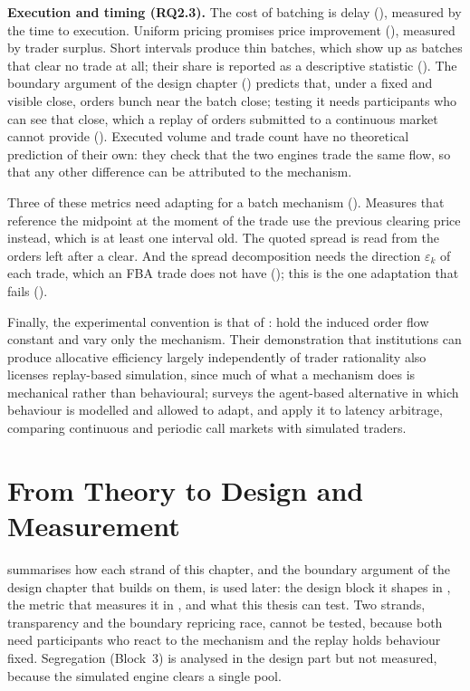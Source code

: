 \textbf{Execution and timing (RQ2.3).} The cost of batching is delay
(), measured by the time to execution. Uniform
pricing promises price improvement (), measured by
trader surplus. Short intervals produce thin batches, which show up as
batches that clear no trade at all; their share is reported as a
descriptive statistic (). The boundary argument of the design
chapter () predicts that, under a fixed and
visible close, orders bunch near the batch close; testing it needs
participants who can see that close, which a replay of orders submitted
to a continuous market cannot provide ().
Executed volume and trade count
have no theoretical prediction of their own: they check that the two
engines trade the same flow, so that any other difference can be
attributed to the mechanism.

Three of these metrics need adapting for a batch mechanism
(). Measures that reference the midpoint at the
moment of the trade use the previous clearing price instead, which is at
least one interval old. The quoted spread is read from the orders left
after a clear. And the spread decomposition needs the direction
$\varepsilon_k$ of each trade, which an FBA trade does not have
(); this is the one adaptation that fails
().

Finally, the experimental convention is that of \citet{gode1993allocative}:
hold the induced order flow constant and vary only the mechanism. Their
demonstration that institutions can produce allocative efficiency largely
independently of trader rationality also licenses replay-based simulation,
since much of what a mechanism does is mechanical rather than behavioural;
\citet{lebaron2006agent} surveys the agent-based alternative in which
behaviour is modelled and allowed to adapt, and \citet{wah2013latency}
apply it to latency arbitrage, comparing continuous and periodic call
markets with simulated traders.

\section{From Theory to Design and Measurement}
\label{sec:theorylinks}

 summarises how each strand of this chapter, and
the boundary argument of the design chapter that builds on them, is used
later: the design block it shapes in , the metric that
measures it in , and what this thesis can test. Two
strands, transparency and the boundary repricing race, cannot be tested,
because both need participants who react to the mechanism and the replay
holds behaviour fixed. Segregation (Block~3) is analysed in the design
part but not measured, because the simulated engine clears a single
pool.

